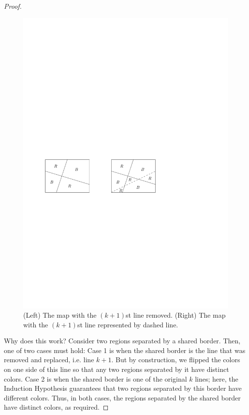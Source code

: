 \documentclass[11pt]{article}
\begin{document}
\begin{proof}
\begin{figure}[h]\label{fig:map}
\centering
\includegraphics[scale = 0.8]{2color5}
\caption{(Left) The map with the $(k+1)$st line removed. (Right) The map with the $(k+1)$st line represented by dashed line.}
\centering
\end{figure}

Why does this work? Consider two regions separated by a shared border. Then, one of two cases must hold: Case 1 is when the shared border is the line that was removed and replaced, i.e. line $k+1$. But by construction, we flipped the colors on one side of this line so that any two regions separated by it have distinct colors. Case 2 is when the shared border is one of the original $k$ lines; here, the Induction Hypothesis guarantees that two regions separated by this border have different colors. Thus, in both cases, the regions separated by the shared border have distinct colors, as required.
\end{proof}
\end{document}
